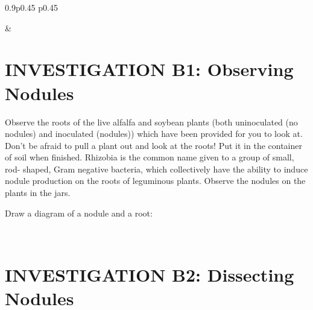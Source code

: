 \documentclass[
  letterpaper,
  twocolumn,
  portrait]{scrbook}
\begin{document}
\begin{table}[h!]
\begin{centerbox}
\begin{threeparttable}
\begin{tabularx}{0.9\textwidth}{p{} p{}}

 &
 \tabularnewline[-0.5pt]


\end{tabularx}
\end{threeparttable}\par\end{centerbox}

\end{table}
 

\hypertarget{investigation-b1-observing-nodules}{%
\section{INVESTIGATION B1: Observing
Nodules}\label{investigation-b1-observing-nodules}}

Observe the roots of the live alfalfa and soybean plants (both
uninoculated (no nodules) and inoculated (nodules)) which have been
provided for you to look at. Don't be afraid to pull a plant out and
look at the roots! Put it in the container of soil when finished.
Rhizobia is the common name given to a group of small, rod- shaped, Gram
negative bacteria, which collectively have the ability to induce nodule
production on the roots of leguminous plants. Observe the nodules on the
plants in the jars.

Draw a diagram of a nodule and a root:

~ ~ ~ ~ ~

\hypertarget{investigation-b2-dissecting-nodules}{%
\section{INVESTIGATION B2: Dissecting
Nodules}\label{investigation-b2-dissecting-nodules}}
\end{document}
